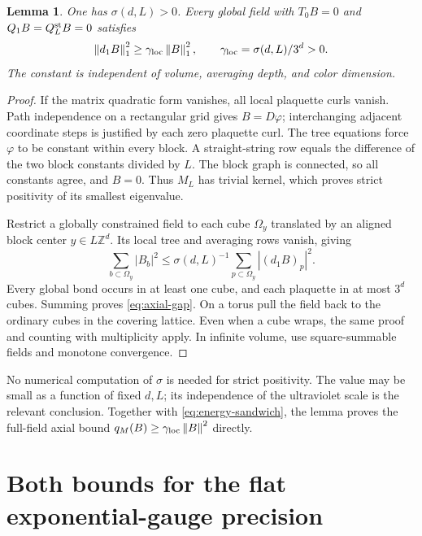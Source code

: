 \documentclass[11pt]{article}
\newtheorem{lemma}[theorem]{Lemma}
\theoremstyle{remark}
\newcommand{\norm}[1]{\left\|#1\right\|}
\begin{document}
\begin{lemma}\label{lem:poincare}
One has $\sigma(d,L)>0$. Every global field with
$T_0B=0$ and $Q_1B=Q_L^{\rm st}B=0$ satisfies
\begin{equation}\label{eq:axial-gap}
 \norm{d_1B}_1^2\ge\gamma_{\rm loc}\norm B_1^2,
 \qquad \gamma_{\rm loc}=\sigma(d,L)/3^d>0.
\end{equation}
The constant is independent of volume, averaging depth, and color
dimension.
\end{lemma}

\begin{proof}
If the matrix quadratic form vanishes, all local plaquette curls
vanish. Path independence on a rectangular grid gives $B=D\varphi$;
interchanging adjacent coordinate steps is justified by each zero
plaquette curl. The tree equations force $\varphi$ to be constant
within every block. A straight-string row equals the difference of
the two block constants divided by $L$. The block graph is connected,
so all constants agree, and $B=0$. Thus $M_L$ has trivial kernel,
which proves strict positivity of its smallest eigenvalue.

Restrict a globally constrained field to each cube $\Omega_y$
translated by an aligned block center $y\in L\mathbb Z^d$.
Its local tree and averaging rows vanish, giving
\[
 \sum_{b\subset\Omega_y}|B_b|^2
 \le\sigma(d,L)^{-1}\sum_{p\subset\Omega_y}|(d_1B)_p|^2.
\]
Every global bond occurs in at least one cube, and each plaquette
in at most $3^d$ cubes. Summing proves \eqref{eq:axial-gap}.
On a torus pull the field back to the ordinary cubes in the covering
lattice. Even when a cube wraps, the same proof and counting with
multiplicity apply. In infinite volume, use square-summable fields
and monotone convergence.
\end{proof}

No numerical computation of $\sigma$ is needed for strict positivity.
The value may be small as a function of fixed $d,L$; its independence
of the ultraviolet scale is the relevant conclusion. Together with
\eqref{eq:energy-sandwich}, the lemma proves the full-field axial
bound $q_M(B)\ge\gamma_{\rm loc}\norm B^2$ directly.

\section{Both bounds for the flat exponential-gauge precision}
\end{document}
